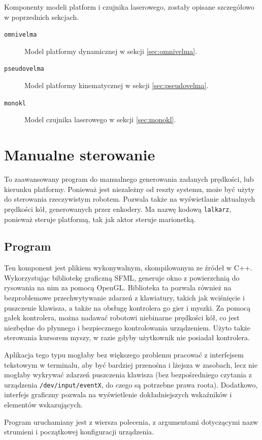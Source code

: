 Komponenty modeli platform i czujnika laserowego, zostały opisane szczegółowo w poprzednich sekcjach.

\begin{description}
	\item[\texttt{omnivelma}] Model platformy dynamicznej w sekcji \ref{sec:omnivelma}.
	\item[\texttt{pseudovelma}] Model platformy kinematycznej w sekcji \ref{sec:pseudovelma}.
	\item[\texttt{monokl}] Model czujnika laserowego w sekcji \ref{sec:monokl}.
\end{description}

\section{Manualne sterowanie}
\label{sec:lalkarz}
	To zaawansowany program do manualnego generowania zadanych prędkości, lub kierunku platformy.
	Ponieważ jest niezależny od reszty systemu, może być użyty do sterowania rzeczywistym robotem.
	Pozwala także na wyświetlanie aktualnych prędkości kół, generowanych przez enkodery.
	Ma nazwę kodową \texttt{lalkarz}, ponieważ steruje platformą, tak jak aktor steruje marionetką.
	
	\subsection{Program}
		Ten komponent jest plikiem wykonywalnym, skompilowanym ze źródeł w C++.
		Wykorzystując bibliotekę graficzną SFML, generuje okno z powierzchnią do rysowania na nim za pomocą OpenGL.
		Biblioteka ta pozwala również na bezproblemowe przechwytywanie zdarzeń z klawiatury, takich jak wciśnięcie i puszczenie klawisza, a także na obsługę kontrolera go gier i myszki.
		Za pomocą gałek kontrolera, można nadawać robotowi niebinarne prędkości kół, co jest niezbędne do płynnego i bezpiecznego kontrolowania urządzeniem.
		Użyto także sterowania kursorem myszy, w razie gdyby użytkownik nie posiadał kontrolera.
		
		Aplikacja tego typu mogłaby bez większego problemu pracować z interfejsem tekstowym w terminalu, aby być bardziej przenośna i lżejsza w zasobach, 
		lecz nie mogłaby wykrywać zdarzeń puszczenia klawisza
		(bez bezpośredniego czytania z urządzenia \texttt{/dev/input/eventX}, do czego są potrzebne prawa roota). 
		Dodatkowo, interfejs graficzny pozwala na wyświetlenie dokładniejszych wskaźników i elementów wskazujących.
		
		Program uruchamiany jest z wiersza polecenia, z argumentami dotyczącymi nazw strumieni i początkowej konfiguracji urządzenia.
	
